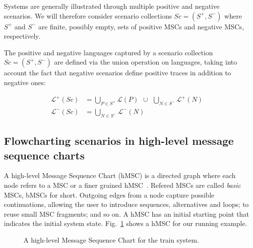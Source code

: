 Systems are generally illustrated through multiple positive and negative scenarios. We will therefore consider scenario collections $Sc = (S^+,S^-)$ where $S^+$ and $S^-$ are finite, possibly empty, sets of positive MSCs and negative MSCs, respectively.

The positive and negative languages captured by a scenario collection $Sc = (S^+,S^-)$ are defined via the union operation on languages, taking into account the fact that negative scenarios define positive traces in addition to negative ones:

\vspace{-0.5cm}
\begin{align}
\mathcal{L}^+(Sc) &= \bigcup_{P \in S^+} \mathcal{L}(P)~~\cup~~\bigcup_{N \in S^{-}} \mathcal{L}^{+}(N) \\
\mathcal{L}^-(Sc) &= \bigcup_{N \in S^-} \mathcal{L}^{-}(N)
\end{align}

\subsection{Flowcharting scenarios in high-level message sequence charts\label{subsection:background-hmsc}}

A high-level Message Sequence Chart (hMSC) is a directed graph where each node refers to a MSC or a finer grained hMSC~\cite{ITU:1996}. Refered MSCs are called \emph{basic} MSCs, bMSCs for short. Outgoing edges from a node capture possible continuations, allowing the user to introduce sequences, alternatives and loops; to reuse small MSC fragments; and so on. A hMSC has an initial starting point that indicates the initial system state. Fig.~\ref{image:train-hmsc} shows a hMSC for our running example.

\vspace{0.4cm}
\begin{figure}[H]\centering
{}
\caption{A high-level Message Sequence Chart for the train system.\label{image:train-hmsc}}
\end{figure}

